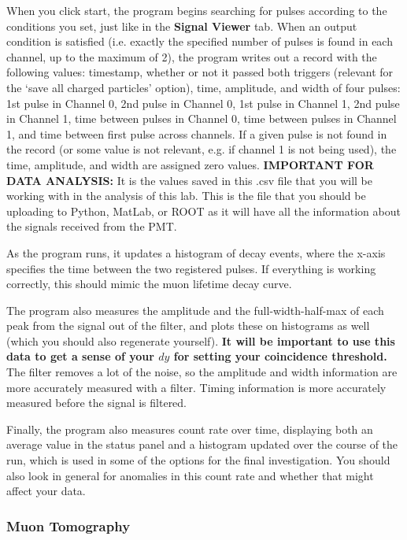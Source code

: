 \documentclass{../lab}
\begin{document}
When you click start, the program begins searching for pulses according to the conditions you set, just like in the \textbf{Signal Viewer} tab. When an output condition is satisfied (i.e. exactly the specified number of pulses is found in each channel, up to the maximum of 2), the program writes out a record with the following values: timestamp, whether or not it passed both triggers (relevant for the `save all charged particles' option), time, amplitude, and width of four pulses: 1st pulse in Channel 0, 2nd pulse in Channel 0, 1st pulse in Channel 1, 2nd pulse in Channel 1, time between pulses in Channel 0, time between pulses in Channel 1, and time between first pulse across channels. If a given pulse is not found in the record (or some value is not relevant, e.g. if channel 1 is not being used), the time, amplitude, and width are assigned zero values. \textbf{IMPORTANT FOR DATA ANALYSIS:} It is the values saved in this .csv file that you will be working with in the analysis of this lab. This is the file that you should be uploading to Python, MatLab, or ROOT as it will have all the information about the signals received from the PMT.

As the program runs, it updates a histogram of decay events, where the x-axis specifies the time between the two registered pulses. If everything is working correctly, this should mimic the muon lifetime decay curve.

The program also measures the amplitude and the full-width-half-max of each peak from the signal out of the filter, and plots these on histograms as well (which you should also regenerate yourself). \textbf{It will be important to use this data to get a sense of your $dy$ for setting your coincidence threshold.} The filter removes a lot of the noise, so the amplitude and width information are more accurately measured with a filter. Timing information is more accurately measured before the signal is filtered.

Finally, the program also measures count rate over time, displaying both an average value in the status panel and a histogram updated over the course of the run, which is used in some of the options for the final investigation. You should also look in general for anomalies in this count rate and whether that might affect your data.

\subsubsection{Muon Tomography}
\end{document}
